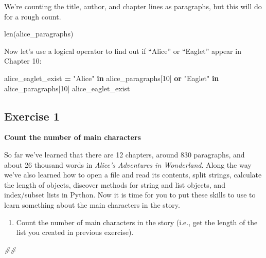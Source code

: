 \documentclass[
]{book}
\newenvironment{Shaded}{\begin{snugshade}}{\end{snugshade}}
\newcommand{\BuiltInTok}[1]{#1}
\newcommand{\CommentTok}[1]{\textcolor[rgb]{0.56,0.35,0.01}{\textit{#1}}}
\newcommand{\DecValTok}[1]{\textcolor[rgb]{0.00,0.00,0.81}{#1}}
\newcommand{\KeywordTok}[1]{\textcolor[rgb]{0.13,0.29,0.53}{\textbf{#1}}}
\newcommand{\NormalTok}[1]{#1}
\newcommand{\OperatorTok}[1]{\textcolor[rgb]{0.81,0.36,0.00}{\textbf{#1}}}
\newcommand{\StringTok}[1]{\textcolor[rgb]{0.31,0.60,0.02}{#1}}
\providecommand{\tightlist}{%
  \setlength{\itemsep}{0pt}\setlength{\parskip}{0pt}}
\begin{document}
We're counting the title, author, and chapter lines as paragraphs, but this will do for a rough count.

\begin{Shaded}
\begin{Highlighting}[]
\BuiltInTok{len}\NormalTok{(alice_paragraphs)}
\end{Highlighting}
\end{Shaded}

Now let's use a logical operator to find out if ``Alice'' or ``Eaglet'' appear in Chapter 10:

\begin{Shaded}
\begin{Highlighting}[]
\NormalTok{alice_eaglet_exist }\OperatorTok{=} \StringTok{"Alice"} \KeywordTok{in}\NormalTok{ alice_paragraphs[}\DecValTok{10}\NormalTok{] }\KeywordTok{or} \StringTok{"Eaglet"} \KeywordTok{in}\NormalTok{ alice_paragraphs[}\DecValTok{10}\NormalTok{]}
\NormalTok{alice_eaglet_exist}
\end{Highlighting}
\end{Shaded}

\hypertarget{exercise-1-4}{%
\subsection{Exercise 1}\label{exercise-1-4}}

\textbf{Count the number of main characters}

So far we've learned that there are 12 chapters, around 830 paragraphs, and about 26 thousand words in \emph{Alice's Adventures in Wonderland}. Along the way we've also learned how to open a file and read its contents, split strings, calculate the length of objects, discover methods for string and list objects, and index/subset lists in Python. Now it is time for you to put these skills to use to learn something about the main characters in the story.

\begin{enumerate}
\def\labelenumi{\arabic{enumi}.}
\tightlist
\item
  Count the number of main characters in the story (i.e., get the length of the list you created in previous exercise).
\end{enumerate}

\begin{Shaded}
\begin{Highlighting}[]
\CommentTok{##}
\end{Highlighting}
\end{Shaded}
\end{document}
